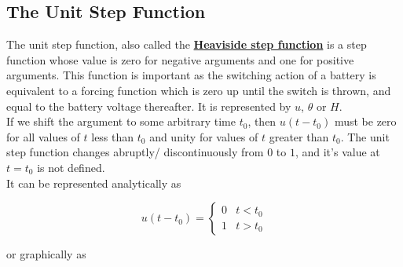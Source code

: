 \documentclass[11pt]{article}
\numberwithin{equation}{section}
\begin{document}
\begin{flushleft}
\color{blue}
\subsection{The Unit Step Function}
\color{black}
The unit step function, also called the \href{https://en.wikipedia.org/wiki/Oliver_Heaviside}
{\textbf{Heaviside step function}} is a step function whose value is zero for negative arguments and
one for positive arguments. This function is important as the switching action of a battery is equivalent
to a forcing function which is zero up until the switch is thrown, and equal to the battery voltage
thereafter. It is represented by $u$, $\theta$ or $H$.\\
If we shift the argument to some arbitrary time $t_0$, then $u(t-t_0)$ must be zero for all values of $t$
less than $t_0$ and unity for values of $t$ greater than $t_0$. The unit step function changes abruptly/
discontinuously from $0$ to $1$, and it's value at $t=t_0$ is not defined.\\
It can be represented analytically as

\begin{equation*}
u(t-t_0) = \begin{cases} 
          0 & t < t_0 \\
          1  & t > t_0 
       \end{cases}
\end{equation*}

or graphically as\\~\\

\begin{tcolorbox}[colframe=black]
\begin{figure}[H]
\centering
\begin{subfigure}{.5\textwidth}
	\centering
  

\end{subfigure}
\end{figure}
\end{tcolorbox}
\end{flushleft}
\end{document}
